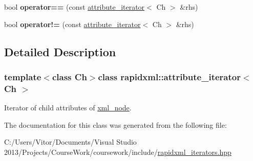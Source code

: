 \begin{DoxyCompactItemize}
\item 
\hypertarget{classrapidxml_1_1attribute__iterator_ab1dc8dd11d21e145a4e3f76d46aead0d}{}bool {\bfseries operator==} (const \hyperlink{classrapidxml_1_1attribute__iterator}{attribute\+\_\+iterator}$<$ Ch $>$ \&rhs)\label{classrapidxml_1_1attribute__iterator_ab1dc8dd11d21e145a4e3f76d46aead0d}

\item 
\hypertarget{classrapidxml_1_1attribute__iterator_a39e8cf336c324521fd9c720abf280d88}{}bool {\bfseries operator!=} (const \hyperlink{classrapidxml_1_1attribute__iterator}{attribute\+\_\+iterator}$<$ Ch $>$ \&rhs)\label{classrapidxml_1_1attribute__iterator_a39e8cf336c324521fd9c720abf280d88}

\end{DoxyCompactItemize}


\subsection{Detailed Description}
\subsubsection*{template$<$class Ch$>$class rapidxml\+::attribute\+\_\+iterator$<$ Ch $>$}

Iterator of child attributes of \hyperlink{classrapidxml_1_1xml__node}{xml\+\_\+node}. 

The documentation for this class was generated from the following file\+:\begin{DoxyCompactItemize}
\item 
C\+:/\+Users/\+Vitor/\+Documents/\+Visual Studio 2013/\+Projects/\+Course\+Work/coursework/include/\hyperlink{rapidxml__iterators_8hpp}{rapidxml\+\_\+iterators.\+hpp}\end{DoxyCompactItemize}
